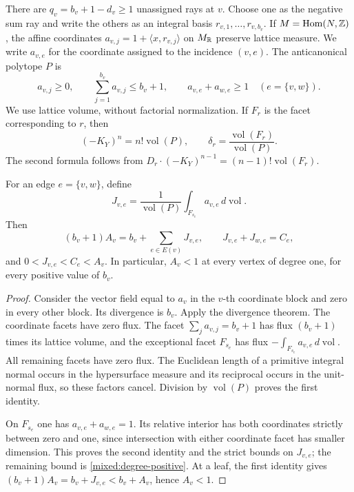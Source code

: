 There are $q_v=b_v+1-d_v\ge1$ unassigned rays at $v$. Choose one as
the negative sum ray and write the others as an integral basis
$r_{v,1},\ldots,r_{v,b_v}$. If $M=\operatorname{Hom}(N,\mathbb{Z})$, the affine
coordinates $a_{v,j}=1+\langle x,r_{v,j}\rangle$ on $M_{\mathbb{R}}$ preserve
lattice measure. We write $a_{v,e}$ for the coordinate assigned to the
incidence $(v,e)$. The anticanonical polytope $P$ is
\begin{equation}\label{mixed:polytope}
 a_{v,j}\ge0,\qquad \sum_{j=1}^{b_v}a_{v,j}\le b_v+1,
 \qquad a_{v,e}+a_{w,e}\ge1\quad(e=\{v,w\}).
\end{equation}
We use lattice volume, without factorial normalization.
If $F_r$ is the facet corresponding to $r$, then
\begin{equation}\label{mixed:facet-ratio}
 (-K_Y)^n=n!\operatorname{vol}(P),\qquad
 \delta_r=\frac{\operatorname{vol}(F_r)}{\operatorname{vol}(P)}.
\end{equation}
The second formula follows from
$D_r\cdot(-K_Y)^{n-1}=(n-1)!\operatorname{vol}(F_r)$.

\begin{lemma}\label{mixed:flux}
For an edge $e=\{v,w\}$, define
\[
 J_{v,e}=\frac{1}{\operatorname{vol}(P)}
     \int_{F_{s_e}}a_{v,e}\,d\operatorname{vol}.
\]
Then
\begin{equation}\label{mixed:flux-identity}
 (b_v+1)A_v=b_v+\sum_{e\in E(v)}J_{v,e},\qquad
 J_{v,e}+J_{w,e}=C_e,
\end{equation}
and $0<J_{v,e}<C_e<A_v$. In particular, $A_v<1$ at every vertex
of degree one, for every positive value of $b_v$.
\end{lemma}

\begin{proof}
Consider the vector field equal to $a_v$ in the $v$-th coordinate block
and zero in every other block. Its divergence is $b_v$. Apply the
divergence theorem.
The coordinate facets have zero flux. The facet
$\sum_j a_{v,j}=b_v+1$ has flux $(b_v+1)$ times its lattice volume,
and the exceptional facet $F_{s_e}$ has flux
$-\int_{F_{s_e}}a_{v,e}\,d\operatorname{vol}$. All remaining facets have
zero flux. The Euclidean length of a primitive integral normal occurs in the
hypersurface measure and its reciprocal occurs in the unit-normal flux,
so these factors cancel. Division by $\operatorname{vol}(P)$ proves the first identity.

On $F_{s_e}$ one has $a_{v,e}+a_{w,e}=1$. Its relative interior has
both coordinates strictly between zero and one, since intersection
with either coordinate facet has smaller dimension. This proves the
second identity and the strict bounds on $J_{v,e}$; the remaining bound
is \eqref{mixed:degree-positive}. At a leaf, the first identity gives
$(b_v+1)A_v=b_v+J_{v,e}<b_v+A_v$, hence $A_v<1$.
\end{proof}


